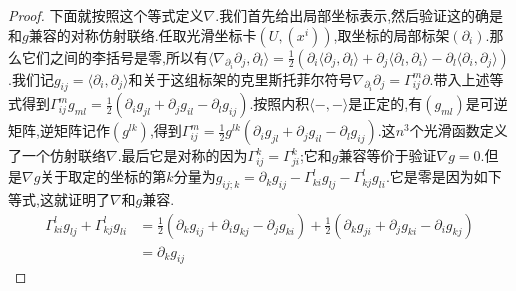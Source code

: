 \begin{enumerate}
\begin{proof}
    	下面就按照这个等式定义$\nabla$.我们首先给出局部坐标表示,然后验证这的确是和$g$兼容的对称仿射联络.任取光滑坐标卡$(U,(x^i))$,取坐标的局部标架$(\partial_i)$.那么它们之间的李括号是零,所以有$\langle\nabla_{\partial_i}\partial_j,\partial_l\rangle=\frac{1}{2}\left(\partial_i\langle\partial_j,\partial_l\rangle+\partial_j\langle\partial_l,\partial_i\rangle-\partial_l\langle\partial_i,\partial_j\rangle\right)$.我们记$g_{ij}=\langle\partial_i,\partial_j\rangle$和关于这组标架的克里斯托菲尔符号$\nabla_{\partial_i}\partial_j=\Gamma_{ij}^m\partial$.带入上述等式得到$\Gamma_{ij}^mg_{ml}=\frac{1}{2}(\partial_ig_{jl}+\partial_jg_{il}-\partial_lg_{ij})$.按照内积$\langle-,-\rangle$是正定的,有$(g_{ml})$是可逆矩阵,逆矩阵记作$(g^{lk})$,得到$\Gamma_{ij}^m=\frac{1}{2}g^{lk}(\partial_ig_{jl}+\partial_jg_{il}-\partial_lg_{ij})$.这$n^3$个光滑函数定义了一个仿射联络$\nabla$.最后它是对称的因为$\Gamma_{ij}^k=\Gamma_{ji}^k$;它和$g$兼容等价于验证$\nabla g=0$.但是$\nabla g$关于取定的坐标的第$k$分量为$g_{ij;k}=\partial_kg_{ij}-\Gamma_{ki}^lg_{lj}-\Gamma_{kj}^lg_{li}$.它是零是因为如下等式,这就证明了$\nabla$和$g$兼容.
    	\begin{align*}
    		\Gamma_{ki}^lg_{lj}+\Gamma_{kj}^lg_{li}&=\frac{1}{2}(\partial_kg_{ij}+\partial_ig_{kj}-\partial_jg_{ki})+\frac{1}{2}(\partial_kg_{ji}+\partial_jg_{ki}-\partial_ig_{kj})\\&=\partial_kg_{ij}
    	\end{align*}
    \end{proof}
\end{enumerate}

